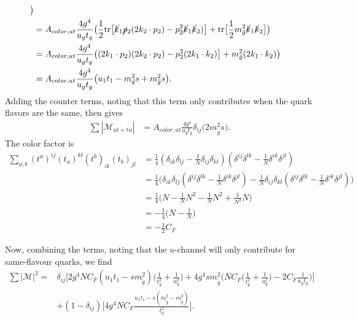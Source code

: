 \documentclass[11pt]{article}
\begin{document}
\begin{flushleft}
\begin{align*}
  \big)\\
&= A_{color, ut} \frac{4 g^4}{u_gt_g} \big(
 \frac{1}{2} \text{tr} \big[ \cancel{k}_1 \cancel{p}_2 (2 k_2 \cdot p_2)- p_2^2\cancel{k}_1 \cancel{k}_2)  \big] + \text{tr} \big[\frac{1}{2} m_{\tilde{g}}^2 \cancel{k}_1  \cancel{k}_2\big]
  \big)\\
  &=  A_{color, ut} \frac{4 g^4}{u_gt_g} \big(
(2k_1 \cdot p_2) (2 k_2 \cdot p_2)- p_2^2(2 k_1 \cdot k_2)  \big] + m_{\tilde{g}}^2(2 k_1 \cdot k_2)
  \big)\\
  &= A_{color, ut} \frac{4 g^4}{u_gt_g} \big(
u_1t_1- m_{\tilde{q}}^2s + m_{\tilde{g}}^2s
  \big).
\end{align*}
Adding the counter terms, noting that this term only contributes when the quark flavors are the same, then gives 
\begin{align*}
\sum |\mathcal{M}_{ut+tu}| &= A_{color, ut} \frac{4 g^4}{u_gt_g} \delta_{ij}\big(2 m_{\tilde{g}}^2s   \big).
\end{align*}
The color factor is
\begin{align*}
\sum_{a,b}(t^a)^{ij}(t_a)^{kl}(t^b)_{ik}(t_b)_{jl} &= \frac{1}{4}(\delta_{ik}\delta_{lj}-\frac{1}{N}\delta_{ij}\delta_{kl})(\delta^{ij}\delta^{lk}-\frac{1}{N}\delta^{ik}\delta^{jl})\\
 &= \frac{1}{4} \big(\delta_{ik}\delta_{lj}(\delta^{ij}\delta^{lk}-\frac{1}{N}\delta^{ik}\delta^{jl}) -\frac{1}{N}\delta_{ij}\delta_{kl}(\delta^{ij}\delta^{lk}-\frac{1}{N}\delta^{ik}\delta^{jl})\big)\\
 &= \frac{1}{4} \big(N-\frac{1}{N}N^2 - \frac{1}{N}N^2 + \frac{1}{N^2} N \big)\\
 &= - \frac{1}{4}\big(N -\frac{1}{N} \big)\\
 &= - \frac{1}{2}C_F
\end{align*}
\end{flushleft}

\begin{flushleft}
Now, combining the terms, noting that the $u$-channel will only contribute for same-flavour quarks, we find
\begin{align*}
\sum |\mathcal{M}|^2 =& \delta_{ij}  \Bigg[2 g^4NC_F(u_1t_1-sm_{\tilde{q}}^2) \big( \frac{1}{t_g^2} + \frac{1}{u_g^2} \big) + 4 g^4 sm_{\tilde{g}}^2 \Big( NC_F \big(\frac{1}{t_g^2} + \frac{1}{u_g^2}\big) -2C_F\frac{1}{u_gt_g} \Big) \Bigg]\\
&+ (1-\delta_{ij})\Bigg[4g^4NC_F  \frac{u_1t_1-s(m_{\tilde{g}}^2-m_{\tilde{g}}^2)}{t_g^2} \Bigg].
\end{align*}
\end{flushleft}





\end{document}
